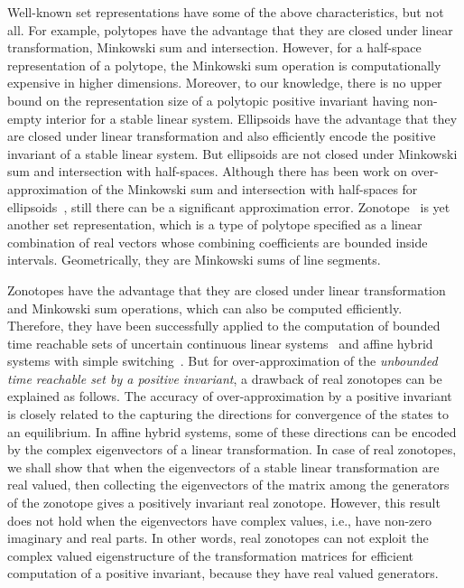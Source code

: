 Well-known set representations have some of the above characteristics,
but not all.  For example, polytopes have the advantage that they are
closed under linear transformation, Minkowski sum and intersection.
However, for a half-space representation of a polytope, the Minkowski
sum operation is computationally expensive in higher dimensions.
Moreover, to our knowledge, there is no upper bound on the
representation size of a polytopic positive invariant having non-empty
interior for a stable linear system.  Ellipsoids have the advantage
that they are closed under linear transformation and also efficiently
encode the positive invariant of a stable linear system.  But
ellipsoids are not closed under Minkowski sum and intersection with
half-spaces.  Although there has been work on over-approximation of
the Minkowski sum and intersection with half-spaces for
ellipsoids~\cite{allamigeon2017fast,kurzhanskiy2006ellipsoidal}, still
there can be a significant approximation
error. Zonotope~\cite{DBLP:conf/hybrid/Girard05} is yet another set
representation, which is a type of polytope specified as a linear
combination of real vectors whose combining coefficients are bounded
inside intervals.  Geometrically, they are Minkowski sums of
line segments.

Zonotopes have the advantage that they are closed under linear
transformation and Minkowski sum operations, which can also be
computed efficiently.  Therefore, they have been successfully applied
to the computation of bounded time reachable sets of uncertain
continuous linear systems~\cite{DBLP:conf/hybrid/Girard05} and affine
hybrid systems with simple
switching~\cite{makhlouf2014networked,girard2008zonotope}.  But for
over-approximation of the {\it unbounded time reachable set by a
positive invariant}, a drawback of real zonotopes can be explained as follows.  
The accuracy of over-approximation by a positive invariant
is closely related to the capturing the directions for convergence of
the states to an equilibrium.  In affine hybrid systems, some of these
directions can be encoded by the complex eigenvectors of a linear
transformation.  In case of real zonotopes, we shall show that when
the eigenvectors of a stable linear transformation are real valued,
then collecting the eigenvectors of the matrix among the generators of
the zonotope gives a positively invariant real zonotope.  However,
this result does not hold when the eigenvectors have complex values,
i.e., have non-zero imaginary and real parts.  In other words, real
zonotopes can not exploit the complex valued eigenstructure of the
transformation matrices for efficient computation of a positive
invariant, because they have real valued generators.

